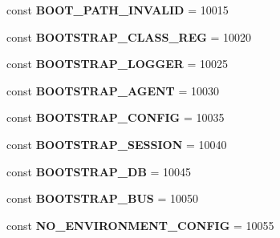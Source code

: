 \begin{DoxyCompactItemize}
\item 
\hypertarget{class_able_polecat___error_a52879fed840afe30ba80510d8df71226}{}const {\bfseries B\+O\+O\+T\+\_\+\+P\+A\+T\+H\+\_\+\+I\+N\+V\+A\+L\+I\+D} = 10015\label{class_able_polecat___error_a52879fed840afe30ba80510d8df71226}

\item 
\hypertarget{class_able_polecat___error_ad9dc0d2bc707c83f05f7b4940d7949e8}{}const {\bfseries B\+O\+O\+T\+S\+T\+R\+A\+P\+\_\+\+C\+L\+A\+S\+S\+\_\+\+R\+E\+G} = 10020\label{class_able_polecat___error_ad9dc0d2bc707c83f05f7b4940d7949e8}

\item 
\hypertarget{class_able_polecat___error_a2600ebee88897c328fa57529acbc3231}{}const {\bfseries B\+O\+O\+T\+S\+T\+R\+A\+P\+\_\+\+L\+O\+G\+G\+E\+R} = 10025\label{class_able_polecat___error_a2600ebee88897c328fa57529acbc3231}

\item 
\hypertarget{class_able_polecat___error_a923efc0b8a655758301f046a1dc32703}{}const {\bfseries B\+O\+O\+T\+S\+T\+R\+A\+P\+\_\+\+A\+G\+E\+N\+T} = 10030\label{class_able_polecat___error_a923efc0b8a655758301f046a1dc32703}

\item 
\hypertarget{class_able_polecat___error_aaa2313fe14a13d0ca6758518605961fe}{}const {\bfseries B\+O\+O\+T\+S\+T\+R\+A\+P\+\_\+\+C\+O\+N\+F\+I\+G} = 10035\label{class_able_polecat___error_aaa2313fe14a13d0ca6758518605961fe}

\item 
\hypertarget{class_able_polecat___error_af83242d521f678f1da10f4d825791312}{}const {\bfseries B\+O\+O\+T\+S\+T\+R\+A\+P\+\_\+\+S\+E\+S\+S\+I\+O\+N} = 10040\label{class_able_polecat___error_af83242d521f678f1da10f4d825791312}

\item 
\hypertarget{class_able_polecat___error_a5ea54d31755b5982f6814f4f77d1ce62}{}const {\bfseries B\+O\+O\+T\+S\+T\+R\+A\+P\+\_\+\+D\+B} = 10045\label{class_able_polecat___error_a5ea54d31755b5982f6814f4f77d1ce62}

\item 
\hypertarget{class_able_polecat___error_a8363c8a2bbf9c2228dd25ed4e550cce7}{}const {\bfseries B\+O\+O\+T\+S\+T\+R\+A\+P\+\_\+\+B\+U\+S} = 10050\label{class_able_polecat___error_a8363c8a2bbf9c2228dd25ed4e550cce7}

\item 
\hypertarget{class_able_polecat___error_a9e50339871cdcd83116a949838d06454}{}const {\bfseries N\+O\+\_\+\+E\+N\+V\+I\+R\+O\+N\+M\+E\+N\+T\+\_\+\+C\+O\+N\+F\+I\+G} = 10055\label{class_able_polecat___error_a9e50339871cdcd83116a949838d06454}


\end{DoxyCompactItemize}
